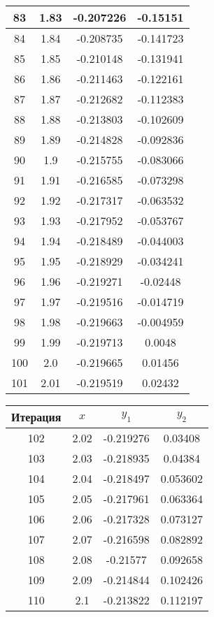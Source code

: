 \begin{center}
\begin{tabular}{|c|c|c|c|}
		83 & 1.83 & -0.207226 & -0.15151 \\
		\hline
		84 & 1.84 & -0.208735 & -0.141723 \\
		\hline
		85 & 1.85 & -0.210148 & -0.131941 \\
		\hline
		86 & 1.86 & -0.211463 & -0.122161 \\
		\hline
		87 & 1.87 & -0.212682 & -0.112383 \\
		\hline
		88 & 1.88 & -0.213803 & -0.102609 \\
		\hline
		89 & 1.89 & -0.214828 & -0.092836 \\
		\hline
		90 & 1.9 & -0.215755 & -0.083066 \\
		\hline
		91 & 1.91 & -0.216585 & -0.073298 \\
		\hline
		92 & 1.92 & -0.217317 & -0.063532 \\
		\hline
		93 & 1.93 & -0.217952 & -0.053767 \\
		\hline
		94 & 1.94 & -0.218489 & -0.044003 \\
		\hline
		95 & 1.95 & -0.218929 & -0.034241 \\
		\hline
		96 & 1.96 & -0.219271 & -0.02448 \\
		\hline
		97 & 1.97 & -0.219516 & -0.014719 \\
		\hline
		98 & 1.98 & -0.219663 & -0.004959 \\
		\hline
		99 & 1.99 & -0.219713 & 0.0048 \\
		\hline
		100 & 2.0 & -0.219665 & 0.01456 \\
		\hline
		101 & 2.01 & -0.219519 & 0.02432 \\
		\hline
	\end{tabular}
\begin{tabular}{|c|c|c|c|}
\hline
Итерация & $ x $ & $ y_{1} $ & $ y_{2} $\\
\hline
		102 & 2.02 & -0.219276 & 0.03408 \\
		\hline
		103 & 2.03 & -0.218935 & 0.04384 \\
		\hline
		104 & 2.04 & -0.218497 & 0.053602 \\
		\hline
		105 & 2.05 & -0.217961 & 0.063364 \\
		\hline
		106 & 2.06 & -0.217328 & 0.073127 \\
		\hline
		107 & 2.07 & -0.216598 & 0.082892 \\
		\hline
		108 & 2.08 & -0.21577 & 0.092658 \\
		\hline
		109 & 2.09 & -0.214844 & 0.102426 \\
		\hline
		110 & 2.1 & -0.213822 & 0.112197 \\

\end{tabular}
\end{center}
